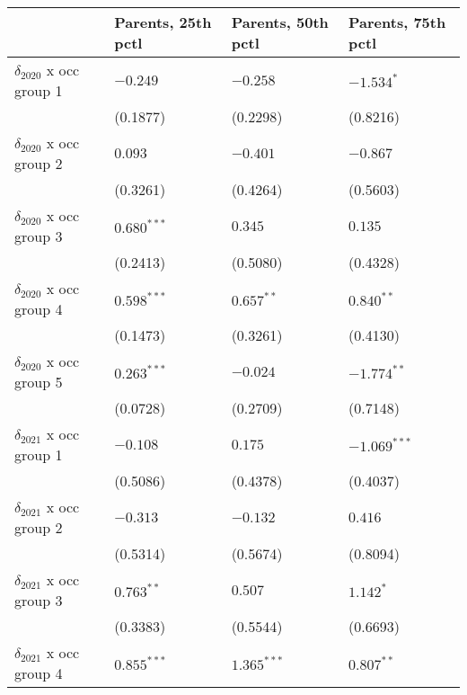 \begin{tabular}{llll}
\toprule
{} & Parents, 25th pctl & Parents, 50th pctl & Parents, 75th pctl \\
\midrule
$\delta_{2020}$ x occ group 1          &           $-0.249$ &           $-0.258$ &         $-1.534^*$ \\
                                       &           (0.1877) &           (0.2298) &           (0.8216) \\
$\delta_{2020}$ x occ group 2          &            $0.093$ &           $-0.401$ &           $-0.867$ \\
                                       &           (0.3261) &           (0.4264) &           (0.5603) \\
$\delta_{2020}$ x occ group 3          &      $0.680^{***}$ &            $0.345$ &            $0.135$ \\
                                       &           (0.2413) &           (0.5080) &           (0.4328) \\
$\delta_{2020}$ x occ group 4          &      $0.598^{***}$ &       $0.657^{**}$ &       $0.840^{**}$ \\
                                       &           (0.1473) &           (0.3261) &           (0.4130) \\
$\delta_{2020}$ x occ group 5          &      $0.263^{***}$ &           $-0.024$ &      $-1.774^{**}$ \\
                                       &           (0.0728) &           (0.2709) &           (0.7148) \\
$\delta_{2021}$ x occ group 1          &           $-0.108$ &            $0.175$ &     $-1.069^{***}$ \\
                                       &           (0.5086) &           (0.4378) &           (0.4037) \\
$\delta_{2021}$ x occ group 2          &           $-0.313$ &           $-0.132$ &            $0.416$ \\
                                       &           (0.5314) &           (0.5674) &           (0.8094) \\
$\delta_{2021}$ x occ group 3          &       $0.763^{**}$ &            $0.507$ &          $1.142^*$ \\
                                       &           (0.3383) &           (0.5544) &           (0.6693) \\
$\delta_{2021}$ x occ group 4          &      $0.855^{***}$ &      $1.365^{***}$ &       $0.807^{**}$ \\

\end{tabular}
